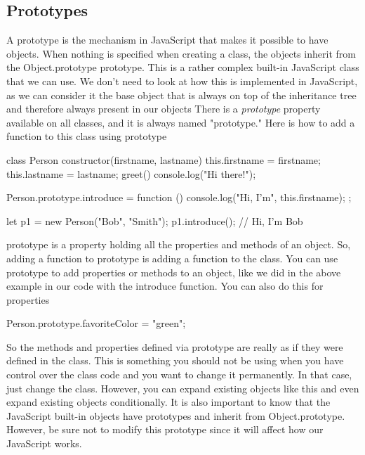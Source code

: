 \documentclass{report}
\begin{document}
    \subsection{Prototypes}
    \bigbreak \noindent 
    A prototype is the mechanism in JavaScript that makes it possible to have objects.
    When nothing is specified when creating a class, the objects inherit from the
    Object.prototype prototype. This is a rather complex built-in JavaScript class that
    we can use. We don't need to look at how this is implemented in JavaScript, as
    we can consider it the base object that is always on top of the inheritance tree and
    therefore always present in our objects
    \bigbreak \noindent 
    There is a \textit{prototype} property available on all classes, and it is always named
    "prototype."
    \bigbreak \noindent 
    Here is how to add a function to this class using prototype
    \bigbreak \noindent 
    \begin{jscode}
        class Person {
            constructor(firstname, lastname) {
                this.firstname = firstname;
                this.lastname = lastname;
            }
            greet() {
                console.log("Hi there!");
            }
        }

        Person.prototype.introduce = function () {
            console.log("Hi, I'm", this.firstname);
        };

        let p1 = new Person("Bob", "Smith");
        p1.introduce(); // Hi, I'm Bob
    \end{jscode}
    \bigbreak \noindent 
    prototype is a property holding all the properties and methods of an object. So,
    adding a function to prototype is adding a function to the class. You can use
    prototype to add properties or methods to an object, like we did in the above
    example in our code with the introduce function. You can also do this for properties
    \bigbreak \noindent 
    \begin{jscode}
        Person.prototype.favoriteColor = "green";
    \end{jscode}
    \bigbreak \noindent 
    So the methods and properties defined via prototype are really as if they were defined in the class. 
    \bigbreak \noindent 
    This is something you should not be using when you have control over the class
    code and you want to change it permanently. In that case, just change the class.
    However, you can expand existing objects like this and even expand existing objects
    conditionally. It is also important to know that the JavaScript built-in objects have
    prototypes and inherit from Object.prototype. However, be sure not to modify this
    prototype since it will affect how our JavaScript works.
\end{document}
